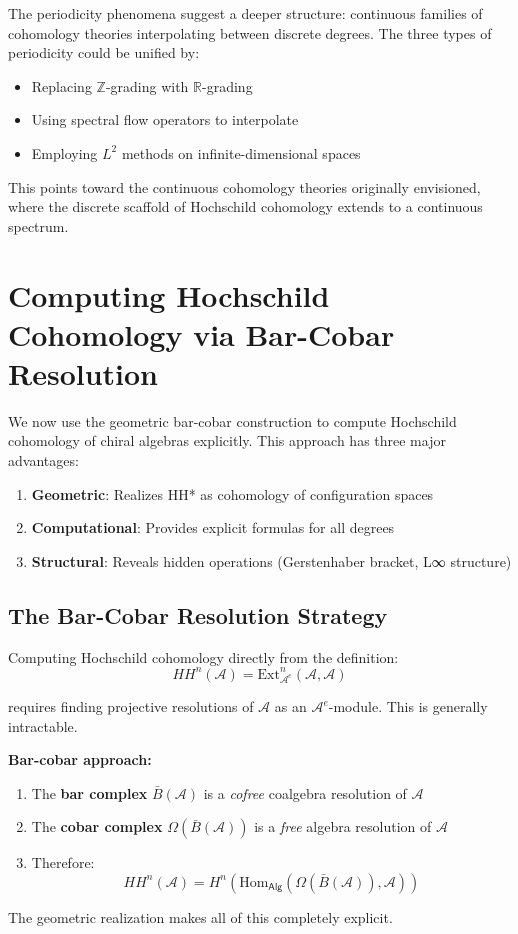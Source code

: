 The periodicity phenomena suggest a deeper structure: continuous families of cohomology theories interpolating between discrete degrees. The three types of periodicity could be unified by:
\begin{itemize}
\item Replacing $\mathbb{Z}$-grading with $\mathbb{R}$-grading
\item Using spectral flow operators to interpolate
\item Employing $L^2$ methods on infinite-dimensional spaces
\end{itemize}

This points toward the continuous cohomology theories originally envisioned, where the discrete scaffold of Hochschild cohomology extends to a continuous spectrum.
\section{Computing Hochschild Cohomology via Bar-Cobar Resolution}
\label{sec:hochschild-via-bar-cobar-complete}

We now use the geometric bar-cobar construction to compute Hochschild cohomology
of chiral algebras explicitly. This approach has three major advantages:
\begin{enumerate}
\item \textbf{Geometric}: Realizes HH* as cohomology of configuration spaces
\item \textbf{Computational}: Provides explicit formulas for all degrees
\item \textbf{Structural}: Reveals hidden operations (Gerstenhaber bracket, L∞ structure)
\end{enumerate}

\subsection{The Bar-Cobar Resolution Strategy}

\begin{strategy}\label{strategy:bar-cobar-resolution}
Computing Hochschild cohomology directly from the definition:
$$HH^n(\mathcal{A}) = \text{Ext}^n_{\mathcal{A}^e}(\mathcal{A}, \mathcal{A})$$

requires finding projective resolutions of $\mathcal{A}$ as an $\mathcal{A}^e$-module.
This is generally intractable.

\textbf{Bar-cobar approach:}
\begin{enumerate}
\item The \textbf{bar complex} $\bar{B}(\mathcal{A})$ is a \emph{cofree} coalgebra resolution
of $\mathcal{A}$
\item The \textbf{cobar complex} $\Omega(\bar{B}(\mathcal{A}))$ is a \emph{free} algebra
resolution of $\mathcal{A}$
\item Therefore:
$$HH^n(\mathcal{A}) = H^n(\text{Hom}_{\mathsf{Alg}}(\Omega(\bar{B}(\mathcal{A})), \mathcal{A}))$$
\end{enumerate}

The geometric realization makes all of this completely explicit.
\end{strategy}

